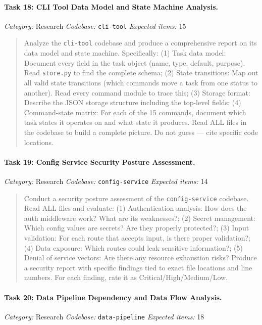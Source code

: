 \paragraph{Task 18: CLI Tool Data Model and State Machine Analysis.}
\textit{Category:} Research \quad
\textit{Codebase:} \texttt{cli-tool} \quad
\textit{Expected items:} 15

\begin{quote}
Analyze the \texttt{cli-tool} codebase and produce a comprehensive report on its data model and state machine. Specifically: (1) Task data model: Document every field in the task object (name, type, default, purpose). Read \texttt{store.py} to find the complete schema; (2) State transitions: Map out all valid state transitions (which commands move a task from one status to another). Read every command module to trace this; (3) Storage format: Describe the JSON storage structure including the top-level fields; (4) Command-state matrix: For each of the 15 commands, document which task states it operates on and what state it produces. Read ALL files in the codebase to build a complete picture. Do not guess --- cite specific code locations.
\end{quote}

\paragraph{Task 19: Config Service Security Posture Assessment.}
\textit{Category:} Research \quad
\textit{Codebase:} \texttt{config-service} \quad
\textit{Expected items:} 14

\begin{quote}
Conduct a security posture assessment of the \texttt{config-service} codebase. Read ALL files and evaluate: (1) Authentication analysis: How does the auth middleware work? What are its weaknesses?; (2) Secret management: Which config values are secrets? Are they properly protected?; (3) Input validation: For each route that accepts input, is there proper validation?; (4) Data exposure: Which routes could leak sensitive information?; (5) Denial of service vectors: Are there any resource exhaustion risks? Produce a security report with specific findings tied to exact file locations and line numbers. For each finding, rate it as Critical/High/Medium/Low.
\end{quote}

\paragraph{Task 20: Data Pipeline Dependency and Data Flow Analysis.}
\textit{Category:} Research \quad
\textit{Codebase:} \texttt{data-pipeline} \quad
\textit{Expected items:} 18

